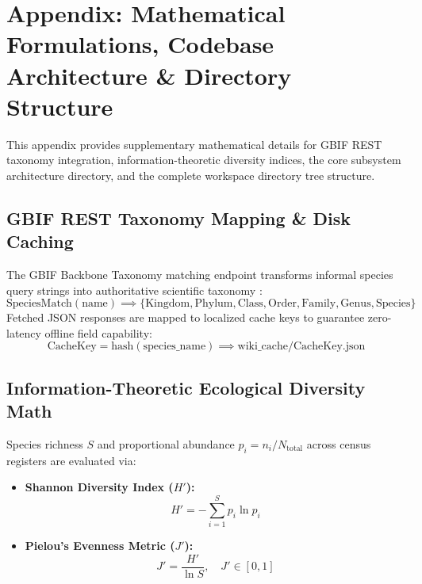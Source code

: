 \documentclass[11pt,a4paper]{article}
\newcommand{\citeblue}[1]{{\color{linkblue}\cite{#1}}}
\begin{document}
\newpage
\appendix
\section{Appendix: Mathematical Formulations, Codebase Architecture \& Directory Structure}

This appendix provides supplementary mathematical details for GBIF REST taxonomy integration, information-theoretic diversity indices, the core subsystem architecture directory, and the complete workspace directory tree structure.

\subsection{GBIF REST Taxonomy Mapping \& Disk Caching}
\label{sec:app_gbif}
The GBIF Backbone Taxonomy matching endpoint transforms informal species query strings into authoritative scientific taxonomy \citeblue{gbif2026backbone}:
\begin{equation}
\text{SpeciesMatch}(\text{name}) \implies \{\text{Kingdom}, \text{Phylum}, \text{Class}, \text{Order}, \text{Family}, \text{Genus}, \text{Species}\}
\end{equation}
Fetched JSON responses are mapped to localized cache keys to guarantee zero-latency offline field capability:
\begin{equation}
\text{CacheKey} = \text{hash}(\text{species\_name}) \implies \text{wiki\_cache/CacheKey.json}
\end{equation}

\subsection{Information-Theoretic Ecological Diversity Math}
\label{sec:app_diversity}
Species richness $S$ and proportional abundance $p_i = n_i / N_{\text{total}}$ across census registers are evaluated via:
\begin{itemize}
    \item \textbf{Shannon Diversity Index ($H'$):}
    \begin{equation}
    H' = -\sum_{i=1}^S p_i \ln p_i
    \end{equation}
    \item \textbf{Pielou's Evenness Metric ($J'$):}
    \begin{equation}
    J' = \frac{H'}{\ln S}, \quad J' \in [0, 1]
    \end{equation}
\end{itemize}
\end{document}
